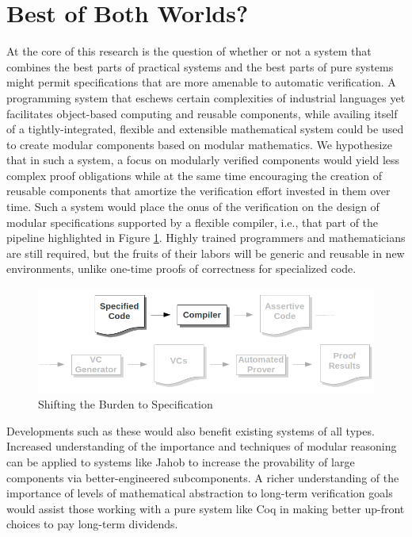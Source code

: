 \section{Best of Both Worlds?}
At the core of this research is the question of whether or not a system that combines the best parts of practical systems and the best parts of pure systems might permit specifications that are more amenable to automatic verification.  A programming system that eschews certain complexities of industrial languages yet facilitates object-based computing and reusable components, while availing itself of a tightly-integrated, flexible and extensible mathematical system could be used to create modular components based on modular mathematics.  We hypothesize that in such a system, a focus on modularly verified components would yield less complex proof obligations while at the same time encouraging the creation of reusable components that amortize the verification effort invested in them over time.  Such a system would place the onus of the verification on the design of modular specifications supported by a flexible compiler, i.e., that part of the pipeline highlighted in Figure \ref{fig:specification}.  Highly trained programmers and mathematicians are still required, but the fruits of their labors will be generic and reusable in new environments, unlike one-time proofs of correctness for specialized code.

\begin{figure}
  \centering
    \includegraphics[width=\textwidth]{specpart}
  \caption{Shifting the Burden to Specification\label{fig:specification}}
\end{figure}

Developments such as these would also benefit existing systems of all types.  Increased understanding of the importance and techniques of modular reasoning can be applied to systems like Jahob to increase the provability of large components via better-engineered subcomponents.  A richer understanding of the importance of levels of mathematical abstraction to long-term verification goals would assist those working with a pure system like Coq in making better up-front choices to pay long-term dividends.

